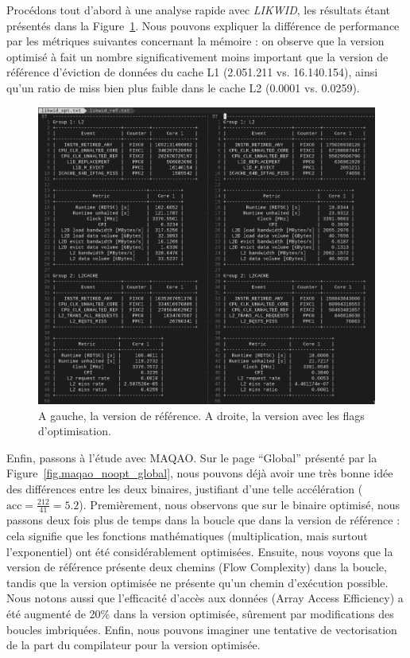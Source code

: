 \documentclass[12pt,a4paper]{article}
\begin{document}
Procédons tout d'abord à une analyse rapide avec \textit{LIKWID}, les résultats
étant présentés dans la Figure~\ref{fig.likwid_noopt}. Nous pouvons expliquer
la différence de performance par les métriques suivantes concernant la mémoire :
on observe que la version optimisé à fait un nombre significativement moins
important que la version de référence d'éviction de données du cache L1 (2.051.211
vs. 16.140.154), ainsi qu'un ratio de miss bien plus faible dans le cache L2
(0.0001 vs. 0.0259).

\begin{figure}[h]
    \centering
    \includegraphics[scale=0.45]{./figures/L1/likwid_noopt.png}
    \caption{A gauche, la version de référence. A droite, la version avec les
    flags d'optimisation.}
    \label{fig.likwid_noopt}
\end{figure}

Enfin, passons à l'étude avec MAQAO. Sur le page \enquote{Global} présenté par
la Figure~\ref{fig.maqao_noopt_global}, nous pouvons déjà avoir une très bonne
idée des différences entre les deux binaires, justifiant d'une telle
accélération ($\text{acc} = \frac{212}{41} = 5.2$). Premièrement, nous observons
que sur le binaire optimisé, nous passons deux fois plus de temps dans la boucle
que dans la version de référence : cela signifie que les fonctions
mathématiques (multiplication, mais surtout l'exponentiel) ont été
considérablement optimisées. Ensuite, nous voyons que la version de référence
présente deux chemins (Flow Complexity) dans la boucle, tandis que la version
optimisée ne présente qu'un chemin d'exécution possible. Nous notons aussi que
l'efficacité d'accès aux données (Array Access Efficiency) a été augmenté de
20\% dans la version optimisée, sûrement par modifications des boucles
imbriquées. Enfin, nous pouvons imaginer une tentative de vectorisation de la
part du compilateur pour la version optimisée.
\end{document}
